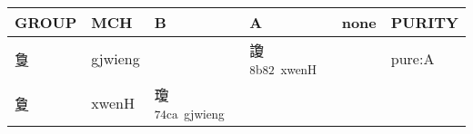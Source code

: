 \documentclass[14pt,a4paper]{scrartcl}
\begin{document}
\begin{longtable}[c]{@{}llllll@{}}
\toprule
\begin{minipage}[b]{0.14\columnwidth}\raggedright\strut
GROUP
\strut\end{minipage} &
\begin{minipage}[b]{0.14\columnwidth}\raggedright\strut
MCH
\strut\end{minipage} &
\begin{minipage}[b]{0.14\columnwidth}\raggedright\strut
B
\strut\end{minipage} &
\begin{minipage}[b]{0.14\columnwidth}\raggedright\strut
A
\strut\end{minipage} &
\begin{minipage}[b]{0.14\columnwidth}\raggedright\strut
none
\strut\end{minipage} &
\begin{minipage}[b]{0.14\columnwidth}\raggedright\strut
PURITY
\strut\end{minipage}\tabularnewline
\midrule
\endhead
\begin{minipage}[t]{0.14\columnwidth}\raggedright\strut
𢿌
\strut\end{minipage} &
\begin{minipage}[t]{0.14\columnwidth}\raggedright\strut
gjwieng
\strut\end{minipage} &
\begin{minipage}[t]{0.14\columnwidth}\raggedright\strut
\strut\end{minipage} &
\begin{minipage}[t]{0.14\columnwidth}\raggedright\strut
讂\textsuperscript{8b82~xwenH}
\strut\end{minipage} &
\begin{minipage}[t]{0.14\columnwidth}\raggedright\strut
\strut\end{minipage} &
\begin{minipage}[t]{0.14\columnwidth}\raggedright\strut
pure:A
\strut\end{minipage}\tabularnewline
\begin{minipage}[t]{0.14\columnwidth}\raggedright\strut
夐
\strut\end{minipage} &
\begin{minipage}[t]{0.14\columnwidth}\raggedright\strut
xwenH
\strut\end{minipage} &
\begin{minipage}[t]{0.14\columnwidth}\raggedright\strut
瓊\textsuperscript{74ca~gjwieng}
\strut\end{minipage} &

\end{longtable}
\end{document}
